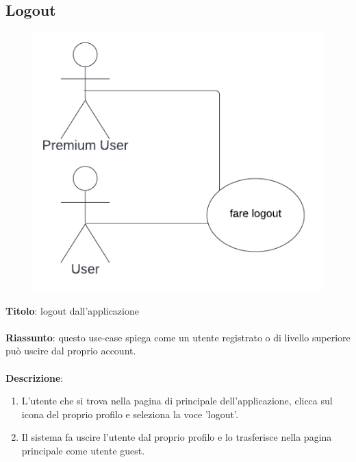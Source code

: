 \newpage
\subsection{Logout} \label{req_login_logout}
\begin{figure}[!h]
\centering
\includegraphics[scale=0.35]{images/use_case_logout.png}
\end{figure}
\noindent
\textbf{Titolo}: logout dall'applicazione \\
\\
\textbf{Riassunto}: questo use-case spiega come un utente registrato o di livello superiore può uscire dal proprio account. \\
\\
\textbf{Descrizione}:
\begin{enumerate}
    \item L'utente che si trova nella pagina di principale dell'applicazione, clicca sul icona del proprio profilo e seleziona la voce 'logout'.
    \item Il sistema fa uscire l'utente dal proprio profilo e lo trasferisce nella pagina principale come utente guest.
\end{enumerate}

